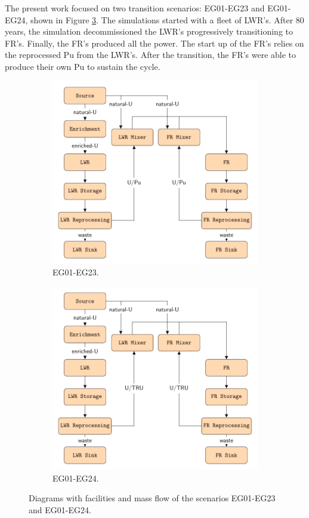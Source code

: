 \documentclass[11pt,letterpaper]{article}
\begin{document}
The present work focused on two transition scenarios: EG01-EG23 and EG01-EG24, shown in Figure \ref{fig:flow}. The simulations started with a fleet of LWR's. After 80 years, the simulation decommissioned the LWR's progressively transitioning to FR's. Finally, the FR's produced all the power. The start up of the FR's relies on the reprocessed Pu from the LWR's. After the transition, the FR's were able to produce their own Pu to sustain the cycle.

\begin{figure}[]
	\centering
	\begin{subfigure}[t]{\textwidth}
		\centering
		\includegraphics[width=0.7\linewidth]{23flow.pdf} 
		\caption{EG01-EG23.}
		\label{fig:23flow}
	\end{subfigure}
	\vspace{1cm}
	\begin{subfigure}[t]{\textwidth}
		\centering
		\includegraphics[width=0.7\linewidth]{24flow.pdf} 
		\caption{EG01-EG24.}
		\label{fig:24flow}
	\end{subfigure}
	\hfill
	\caption{Diagrams with facilities and mass flow of the scenarios EG01-EG23 and EG01-EG24.}
	\label{fig:flow}
\end{figure}
\end{document}
